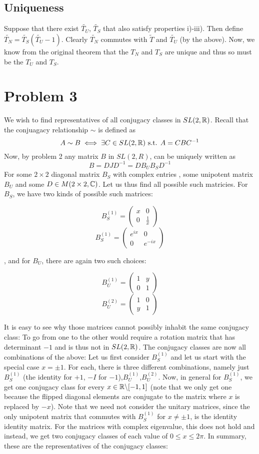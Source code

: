 \subsection*{Uniqueness}
Suppose that there exist $\tilde{T_U}$, $\tilde{T_S}$ that also satisfy properties i)-iii). Then define $\tilde{T_N} = \tilde{T_S}(\tilde{T_U}-1)$. Clearly $\tilde{T_N}$ commutes with $\tilde{T}$ and $\tilde{T_U}$ (by the above). Now, we know from the original theorem that the $T_N$ and $T_S$ are unique and thus so must be the $T_U$ and $T_S$. 
\section*{Problem 3}
We wish to find representatives of all conjugacy classes in $SL(2,\mathbb{R})$. Recall that the conjuagacy relationship $\sim$ is defined as
\[ A\sim B \iff \exists C\in SL(2,\mathbb{R}) \text{ s.t. } A=CBC^{-1} \]
Now, by problem 2 any matrix $B$ in $SL(2,R)$, can be uniquely written as 
\[ B= DJD^{-1} = DB_UB_SD^{-1} \]
For some $2\times 2$ diagonal matrix $B_S$ with complex entries , some unipotent matrix $B_U$ and some $D\in M(2\times 2,\mathbb{C})$. Let us thus find all possible such matricies. For $B_S$, we have two kinds of possible such matrices:
\begin{multicols}{2}
\noindent
\[  B^{(1)}_S = \begin{pmatrix}
x&0\\
0&\frac{1}{x}
\end{pmatrix} \]
\[  B^{(1)}_S = \begin{pmatrix}
e^{ix}&0\\
0&e^{-ix}
\end{pmatrix} \]
\end{multicols}, and for 
$B_U$, there are again two such choices:
\begin{multicols}{2}
\noindent
\[ B^{(1)}_U = \begin{pmatrix}
1&y\\
0&1 \end{pmatrix}\]
\[ B^{(2)}_U = \begin{pmatrix}
1&0\\
y&1 \end{pmatrix}\]
\end{multicols}
It is easy to see why those matrices cannot possibly inhabit the same conjugacy class: To go from one to the other would require a rotation matrix that has determinant $-1$ and is thus not in $SL(2,\mathbb{R})$.
The conjugacy classes are now all combinations of the above:
Let us first consider $B^{(1)}_S$ and let us start with the special case $x=\pm 1$. For each, there is three different combinations, namely just $B^{(1)}_S$ (the identity for $+1$, $-I$ for $-1$),$B^{(1)}_U$,$B^{(2)}_U$. Now, in general for $B^{(1)}_S$, we get one conjugacy class for every $x\in \mathbb{R} \backslash [-1,1]$ (note that we only get one because the flipped diagonal elements are conjugate to the matrix where $x$ is replaced by $-x$). Note that we need not consider the unitary matrices, since the only unipotent matrix that commutes with $B^{(1)}_S$ for $x \neq \pm 1$, is the identity identity matrix. For the matrices with complex eigenvalue, this does not hold and instead, we get two conjugacy classes of each value of $0\leq x \leq 2\pi$. In summary, these are the representatives of the conjugacy classes:
